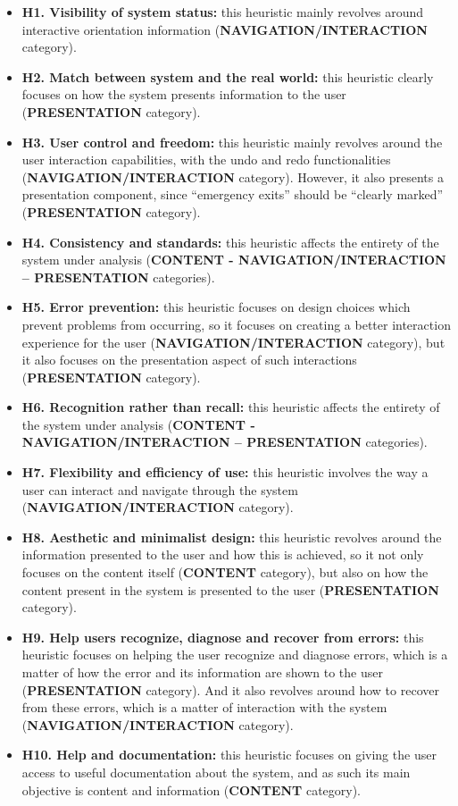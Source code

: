 \begin{itemize}
	\item \textbf{H1. Visibility of system status:} this heuristic mainly revolves around interactive orientation information (\textbf{NAVIGATION/INTERACTION} category).
	\item \textbf{H2. Match between system and the real world:} this heuristic clearly focuses on how the system presents information to the user (\textbf{PRESENTATION} category).
	\item \textbf{H3. User control and freedom:} this heuristic mainly revolves around the user interaction capabilities, with the undo and redo functionalities (\textbf{NAVIGATION/INTERACTION} category). However, it also presents a presentation component, since “emergency exits” should be “clearly marked” (\textbf{PRESENTATION} category).
	\item \textbf{H4. Consistency and standards:} this heuristic affects the entirety of the system under analysis (\textbf{CONTENT - NAVIGATION/INTERACTION – PRESENTATION} categories).
	\item \textbf{H5. Error prevention:} this heuristic focuses on design choices which prevent problems from occurring, so it focuses on creating a better interaction experience for the user (\textbf{NAVIGATION/INTERACTION} category), but it also focuses on the presentation aspect of such interactions (\textbf{PRESENTATION} category).
	\item \textbf{H6. Recognition rather than recall:} this heuristic affects the entirety of the system under analysis (\textbf{CONTENT - NAVIGATION/INTERACTION – PRESENTATION} categories).
	\item \textbf{H7. Flexibility and efficiency of use:} this heuristic involves the way a user can interact and navigate through the system (\textbf{NAVIGATION/INTERACTION} category).
	\item \textbf{H8. Aesthetic and minimalist design:} this heuristic revolves around the information presented to the user and how this is achieved, so it not only focuses on the content itself (\textbf{CONTENT} category), but also on how the content present in the system is presented to the user (\textbf{PRESENTATION} category).
	\item \textbf{H9. Help users recognize, diagnose and recover from errors:} this heuristic focuses on helping the user recognize and diagnose errors, which is a matter of how the error and its information are shown to the user (\textbf{PRESENTATION} category). And it also revolves around how to recover from these errors, which is a matter of interaction with the system (\textbf{NAVIGATION/INTERACTION} category).
	\item \textbf{H10. Help and documentation:} this heuristic focuses on giving the user access to useful documentation about the system, and as such its main objective is content and information (\textbf{CONTENT} category).
\end{itemize}

